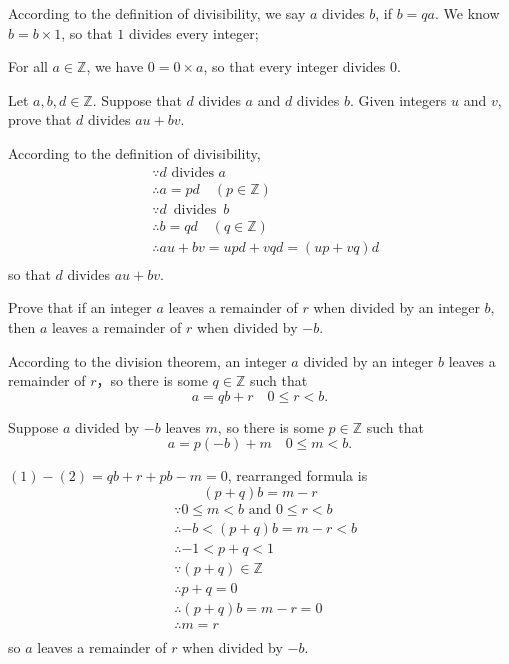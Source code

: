 \begin{solution}
According to the definition of divisibility, we say $a$ divides $b$, if $b=qa$. We know $b=b\times1$, so that $1$ divides every integer; 

For all $a \in \mathbb{Z}$, we have $0=0\times a$, so that every integer divides $0$. 
\end{solution}


\begin{exercise}
\label{exDivisibilityIsLinear}
Let $a,b,d \in \mathbb{Z}$. Suppose that $d$ divides $a$ and $d$ divides $b$. Given integers $u$ and $v$, prove that $d$ divides $au+bv$.
\end{exercise}

\begin{solution}
According to the definition of divisibility, 
\begin{align*}
&\because d \text{ divides } a\\
&\therefore a=pd \quad(p \in \mathbb{Z})\\
&\because d \,\text{ divides }\, b\\
&\therefore b=qd \quad(q \in \mathbb{Z})\\
&\therefore au+bv = upd + vqd = (up+vq)d\\ 
\end{align*}
so that $d$ divides $au+bv$.
\end{solution}


\begin{exercise}
Prove that if an integer $a$ leaves a remainder of $r$ when divided by an integer $b$, then $a$ leaves a remainder of $r$ when divided by $-b$.
\end{exercise}

\begin{solution}
According to the division theorem, an integer $a$ divided by an integer $b$ leaves a remainder of $r$，so there is some $q \in \mathbb{Z}$ such that \\
\[a = qb+r \quad 0 \le r < b \tag{1}.\] 

Suppose $a$ divided by $-b$ leaves $m$, so there is some $p \in \mathbb{Z}$ such that \\
\[a=p(-b)+m \quad 0 \le m < b \tag{2}.\]

$(1)-(2)=qb+r+pb-m=0$, rearranged formula is
\[(p+q)b=m-r\]
\begin{align*}
&\because 0 \le m < b \text{ and } 0 \le r < b \\
&\therefore -b < (p+q)b=m-r < b \\
&\therefore -1 < p+q < 1 \\
&\because (p+q) \in \mathbb{Z} \\
&\therefore p+q=0 \\
&\therefore (p+q)b=m-r=0 \\
&\therefore m=r \\
\end{align*}
so $a$ leaves a remainder of $r$ when divided by $-b$.
\end{solution}

